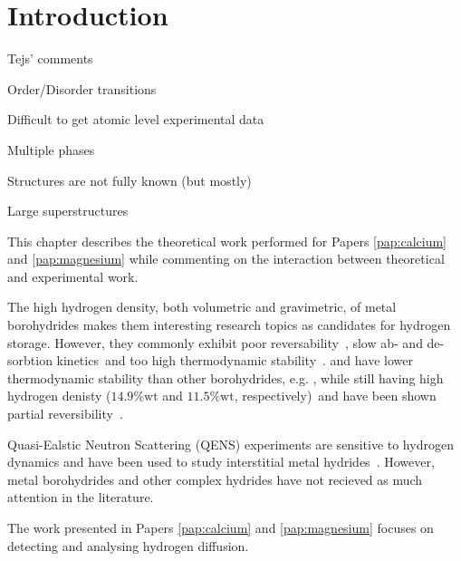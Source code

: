 \section{Introduction}
\label{sec:borohydrides-introduction}


Tejs' comments
\bit
\item Order/Disorder transitions
\item Difficult to get atomic level experimental data
\item Multiple phases
\item Structures are not fully known (but mostly)
\item Large superstructures
\eit

This chapter describes the theoretical work performed for Papers \ref{pap:calcium} and \ref{pap:magnesium} while commenting on the interaction between theoretical and experimental work.

The high hydrogen density, both volumetric and gravimetric, of metal borohydrides makes them interesting research topics as candidates for hydrogen storage.
However, they commonly exhibit poor reversability~\citemiss, slow ab- and de-sorbtion kinetics~\citemiss and too high thermodynamic stability~\citemiss.
 and  have lower thermodynamic stability than other borohydrides, e.g. , while still having high hydrogen denisty ($14.9\%\text{wt}$ and $11.5\%\text{wt}$, respectively)~\citemiss and have been shown partial reversibility~\citemiss.

Quasi-Ealstic Neutron Scattering (QENS) experiments are sensitive to hydrogen dynamics and have been used to study interstitial metal hydrides~\citemiss.
However, metal borohydrides and other complex hydrides have not recieved as much attention in the literature.

The work presented in Papers \ref{pap:calcium} and \ref{pap:magnesium} focuses on detecting and analysing hydrogen diffusion.

